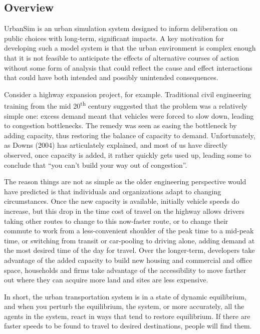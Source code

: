 \subsection{Overview}

UrbanSim is an urban simulation system designed to inform deliberation on public choices with long-term, significant impacts. A key motivation for developing such a model system is that the urban environment
is complex enough that it is not feasible to anticipate the effects of alternative courses of action without some form of analysis that could reflect the cause and effect interactions that could have both intended and possibly unintended consequences.

Consider a highway expansion project, for example. Traditional civil engineering training from the mid 20\textsuperscript{th} century suggested that the problem was a relatively simple one: excess demand meant that vehicles were forced to slow down, leading to congestion bottlenecks. The remedy was seen as easing the bottleneck by adding capacity, thus restoring the balance of capacity to demand. Unfortunately, as Downs (2004) has articulately explained, and most of us have directly observed, once capacity is added, it rather quickly gets used up, leading some to conclude that \enquote{you can't build your way out of congestion}.

The reason things are not as simple as the older engineering perspective would have predicted is that individuals and organizations adapt to changing circumstances. Once the new capacity is available, initially vehicle speeds do increase, but this drop in the time cost of travel on the highway allows drivers taking other routes to change to this now-faster route, or to change their commute to work from a less-convenient shoulder of the peak time to a mid-peak time, or switching from transit or car-pooling to driving alone, adding demand at the most desired time of the day for travel. Over the longer-term, developers take advantage of the added capacity to build new housing and commercial and office space, households and firms take advantage of the accessibility to move farther out where they can acquire more land and sites are less expensive.

In short, the urban transportation system is in a state of dynamic equilibrium, and when you perturb the equilibrium, the system, or more accurately, all the agents in the system, react in ways that tend to restore equilibrium. If there are faster speeds to be found to travel to desired destinations, people will find them.

